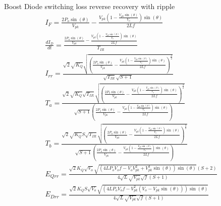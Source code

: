 \documentclass[12pt]{report}
\begin{document}
Boost Diode switching loss reverse recovery with ripple
\begin{align}
I_{F} = \frac{2 P_{o} \sin{\left(\theta \right)}}{V_{pk}} - \frac{V_{pk} \left(1 - \frac{V_{pk} \sin{\left(\theta \right)}}{V_{o}}\right) \sin{\left(\theta \right)}}{2 L f}\\
\frac{dI_{D}}{dt} = \frac{\frac{2 P_{o} \sin{\left(\theta \right)}}{V_{pk}} - \frac{V_{pk} \left(1 - \frac{V_{pk} \sin{\left(\theta \right)}}{V_{o}}\right) \sin{\left(\theta \right)}}{2 L f}}{T_{IR}}\\
I_{rr} = \frac{\sqrt{2} \sqrt{K_{Q}} \sqrt{\left(\frac{2 P_{o} \sin{\left(\theta \right)}}{V_{pk}} - \frac{V_{pk} \left(1 - \frac{V_{pk} \sin{\left(\theta \right)}}{V_{o}}\right) \sin{\left(\theta \right)}}{2 L f}\right)^{\frac{3}{2}}}}{\sqrt{T_{IR}} \sqrt{S + 1}}\\
T_{a} = \frac{\sqrt{2} \sqrt{K_{Q}} \sqrt{T_{IR}} \sqrt{\left(\frac{2 P_{o} \sin{\left(\theta \right)}}{V_{pk}} - \frac{V_{pk} \left(1 - \frac{V_{pk} \sin{\left(\theta \right)}}{V_{o}}\right) \sin{\left(\theta \right)}}{2 L f}\right)^{\frac{3}{2}}}}{\sqrt{S + 1} \left(\frac{2 P_{o} \sin{\left(\theta \right)}}{V_{pk}} - \frac{V_{pk} \left(1 - \frac{V_{pk} \sin{\left(\theta \right)}}{V_{o}}\right) \sin{\left(\theta \right)}}{2 L f}\right)}\\
T_{b} = \frac{\sqrt{2} \sqrt{K_{Q}} S \sqrt{T_{IR}} \sqrt{\left(\frac{2 P_{o} \sin{\left(\theta \right)}}{V_{pk}} - \frac{V_{pk} \left(1 - \frac{V_{pk} \sin{\left(\theta \right)}}{V_{o}}\right) \sin{\left(\theta \right)}}{2 L f}\right)^{\frac{3}{2}}}}{\sqrt{S + 1} \left(\frac{2 P_{o} \sin{\left(\theta \right)}}{V_{pk}} - \frac{V_{pk} \left(1 - \frac{V_{pk} \sin{\left(\theta \right)}}{V_{o}}\right) \sin{\left(\theta \right)}}{2 L f}\right)}\\
E_{Qrr} = \frac{\sqrt{2} K_{Q} \sqrt{V_{o}} \sqrt{\left(4 L P_{o} V_{o} f - V_{o} V_{pk}^{2} + V_{pk}^{3} \sin{\left(\theta \right)}\right) \sin{\left(\theta \right)}} \left(S + 2\right)}{4 \sqrt{L} \sqrt{V_{pk}} \sqrt{f} \left(S + 1\right)}\\
E_{Drr} = \frac{\sqrt{2} K_{Q} S \sqrt{V_{o}} \sqrt{\left(4 L P_{o} V_{o} f - V_{pk}^{2} \left(V_{o} - V_{pk} \sin{\left(\theta \right)}\right)\right) \sin{\left(\theta \right)}}}{4 \sqrt{L} \sqrt{V_{pk}} \sqrt{f} \left(S + 1\right)}\\
\end{align}
\end{document}
